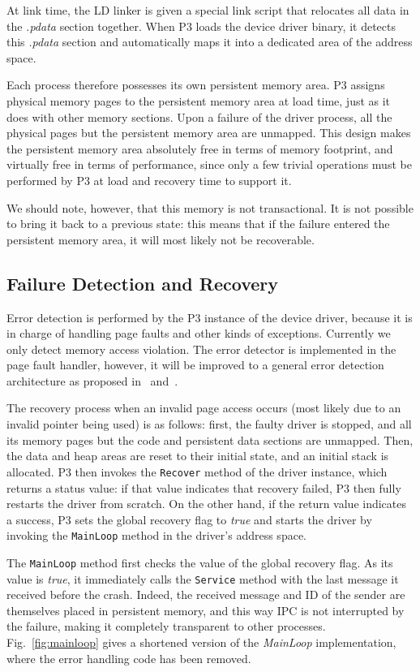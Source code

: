 \documentclass[times, 10pt, twocolumn]{article}
\begin{document}
At link time, the LD linker is given a special link script that relocates all data in the \emph{.pdata} section together. When P3 loads the device driver binary, it detects this \emph{.pdata} section and automatically maps it into a dedicated area of the address space.

Each process therefore possesses its own persistent memory area. P3 assigns physical memory pages to the persistent memory area at load time, just as it does with other memory sections. Upon a failure of the driver process, all the physical pages but the persistent memory area are unmapped. This design makes the persistent memory area absolutely free in terms of memory footprint, and virtually free in terms of performance, since only a few trivial operations must be performed by P3 at load and recovery time to support it.

We should note, however, that this memory is not transactional. It is not possible to bring it back to a previous state: this means that if the failure entered the persistent memory area, it will most likely not be recoverable.

\subsection{Failure Detection and Recovery}
Error detection is performed by the P3 instance of the device driver, because it is in charge of handling page faults and other kinds of exceptions. Currently we only detect memory access violation.  The error detector is implemented in the page fault handler, however, it will be improved to a general error detection architecture as proposed in~\cite{Qin2007} and~\cite{Wang2006}.

The recovery process when an invalid page access occurs (most likely due to an invalid pointer being used) is as follows: first, the faulty driver is stopped, and all its memory pages but the code and persistent data sections are unmapped. Then, the data and heap areas are reset to their initial state, and an initial stack is allocated. P3 then invokes the \texttt{Recover} method of the driver instance, which returns a status value: if that value indicates that recovery failed, P3 then fully restarts the driver from scratch. On the other hand, if the return value indicates a success, P3 sets the global recovery flag to \emph{true} and starts the driver by invoking the \texttt{MainLoop} method in the driver's address space.

The \texttt{MainLoop} method first checks the value of the global recovery flag. As its value is \emph{true}, it immediately calls the \texttt{Service} method with the last message it received before the crash. Indeed, the received message and ID of the sender are themselves placed in persistent memory, and this way IPC is not interrupted by the failure, making it completely transparent to other processes. Fig.~\ref{fig:mainloop} gives a shortened version of the \emph{MainLoop} implementation, where the error handling code has been removed.
\end{document}
